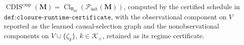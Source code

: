 \(\operatorname{CDIS}^{\mathrm{cmp}}(\mathbf M)=\operatorname{Cl}_{\mathsf R_{\mathrm{SI}}}(\mathcal P_{\mathrm{init}}(\mathbf M))\), computed by the certified schedule in \(\texttt{def:closure-runtime-certificate}\), with the observational component on \(V\) reported as the learned causal-selection graph and the nonobservational components on \(V\cup\{\zeta_k\}\), \(k\in\mathcal K_+\), retained as its regime certificate.